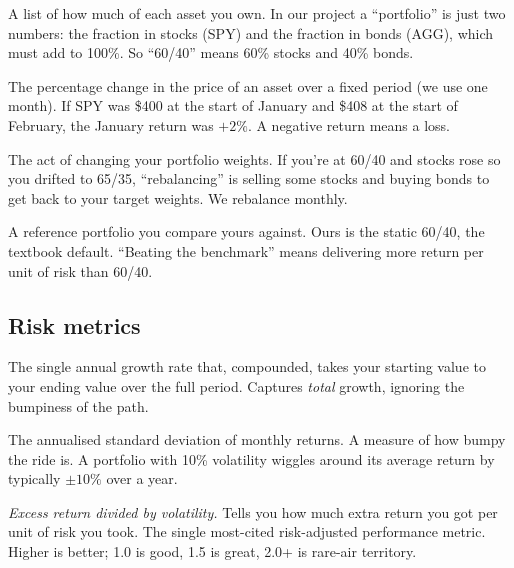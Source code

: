 \documentclass[11pt]{article}
\begin{document}
\begin{definition}[Portfolio]
A list of how much of each asset you own. In our project a ``portfolio'' is just two numbers: the fraction in stocks (SPY) and the fraction in bonds (AGG), which must add to 100\%. So ``60/40'' means 60\% stocks and 40\% bonds.
\end{definition}

\begin{definition}[Return]
The percentage change in the price of an asset over a fixed period (we use one month). If SPY was \$400 at the start of January and \$408 at the start of February, the January return was $+2\%$. A negative return means a loss.
\end{definition}

\begin{definition}[Rebalance]
The act of changing your portfolio weights. If you're at 60/40 and stocks rose so you drifted to 65/35, ``rebalancing'' is selling some stocks and buying bonds to get back to your target weights. We rebalance monthly.
\end{definition}

\begin{definition}[Benchmark]
A reference portfolio you compare yours against. Ours is the static 60/40, the textbook default. ``Beating the benchmark'' means delivering more return per unit of risk than 60/40.
\end{definition}

\subsection{Risk metrics}

\begin{definition}
The single annual growth rate that, compounded, takes your starting value to your ending value over the full period. Captures \emph{total} growth, ignoring the bumpiness of the path.
\end{definition}

\begin{definition}[Volatility]
The annualised standard deviation of monthly returns. A measure of how bumpy the ride is. A portfolio with 10\% volatility wiggles around its average return by typically $\pm 10\%$ over a year.
\end{definition}

\begin{definition}
\emph{Excess return divided by volatility.} Tells you how much extra return you got per unit of risk you took. The single most-cited risk-adjusted performance metric. Higher is better; 1.0 is good, 1.5 is great, 2.0+ is rare-air territory.
\end{definition}
\end{document}
